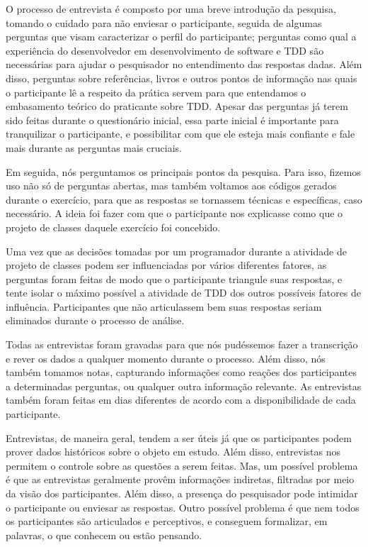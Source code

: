 O processo de entrevista é composto por uma breve introdução da pesquisa, tomando
o cuidado para não enviesar o participante, seguida de algumas perguntas que visam
caracterizar o perfil do participante; perguntas como qual a experiência do
desenvolvedor em desenvolvimento de software e TDD são necessárias para ajudar o
pesquisador no entendimento das respostas dadas. Além disso, perguntas sobre
referências, livros e outros pontos de informação nas quais o participante lê a
respeito da prática servem para que entendamos o embasamento teórico
do praticante sobre TDD. Apesar das perguntas já terem sido feitas durante
o questionário inicial, essa parte inicial é importante para tranquilizar
o participante, e possibilitar com que ele esteja mais confiante e fale
mais durante as perguntas mais cruciais.

Em seguida, nós perguntamos os principais pontos da pesquisa.
Para isso, fizemos uso não só de perguntas abertas, mas também
voltamos aos códigos gerados durante o exercício, para que as respostas se tornassem técnicas e
específicas, caso necessário. A ideia foi fazer com que o participante nos explicasse
como que o projeto de classes daquele exercício foi concebido.

Uma vez que as decisões tomadas por um programador durante a atividade de projeto de classes
podem ser influenciadas por vários diferentes fatores, 
as perguntas foram feitas de modo que o participante triangule suas respostas,
e tente isolar o máximo possível a atividade de TDD dos outros possíveis fatores
de influência. Participantes que não articulassem bem suas respostas seriam eliminados
durante o processo de análise.

Todas as entrevistas foram gravadas para que nós pudéssemos fazer a
transcrição e rever os dados a qualquer momento durante o processo. Além disso,
nós também tomamos notas, capturando informações como reações dos 
participantes a determinadas perguntas, ou qualquer outra informação relevante. 
As entrevistas também foram feitas em dias diferentes de acordo com a disponibilidade
de cada participante.

Entrevistas, de maneira geral, tendem a ser úteis já que os participantes podem prover dados históricos 
sobre o objeto em estudo.
Além disso, entrevistas nos permitem o controle sobre as questões a serem feitas.
Mas, um possível problema é que as entrevistas geralmente provêm informações indiretas, 
filtradas por meio da visão dos participantes. Além disso, a presença do pesquisador pode 
intimidar o participante ou enviesar as respostas.
Outro possível problema é que nem todos os participantes são articulados e perceptivos, e conseguem
formalizar, em palavras, o que conhecem ou estão pensando.


